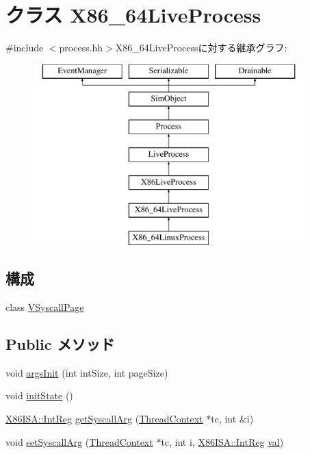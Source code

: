 \hypertarget{classX86ISA_1_1X86__64LiveProcess}{
\section{クラス X86\_\-64LiveProcess}
\label{classX86ISA_1_1X86__64LiveProcess}
}


{\ttfamily \#include $<$process.hh$>$}X86\_\-64LiveProcessに対する継承グラフ:\begin{figure}[H]
\begin{center}
\leavevmode
\includegraphics[height=7cm]{classX86ISA_1_1X86__64LiveProcess}
\end{center}
\end{figure}
\subsection*{構成}
\begin{DoxyCompactItemize}
\item 
class \hyperlink{classX86ISA_1_1X86__64LiveProcess_1_1VSyscallPage}{VSyscallPage}
\end{DoxyCompactItemize}
\subsection*{Public メソッド}
\begin{DoxyCompactItemize}
\item 
void \hyperlink{classX86ISA_1_1X86__64LiveProcess_a60e5314ffeede1e51c6bcb2cf606ca92}{argsInit} (int intSize, int pageSize)
\item 
void \hyperlink{classX86ISA_1_1X86__64LiveProcess_a3c34ea9b29f410748d4435a667484924}{initState} ()
\item 
\hyperlink{namespaceX86ISA_a0e080577527fb3e9685399f75b5caf15}{X86ISA::IntReg} \hyperlink{classX86ISA_1_1X86__64LiveProcess_a6f33c62983b3e68106d1cdb43b9fc09c}{getSyscallArg} (\hyperlink{classThreadContext}{ThreadContext} $\ast$tc, int \&i)
\item 
void \hyperlink{classX86ISA_1_1X86__64LiveProcess_a834e8e05416e3487f87d942259506abe}{setSyscallArg} (\hyperlink{classThreadContext}{ThreadContext} $\ast$tc, int i, \hyperlink{namespaceX86ISA_a0e080577527fb3e9685399f75b5caf15}{X86ISA::IntReg} \hyperlink{namespaceX86ISA_ae13bf1250853ff6b72aabe3c79b587cc}{val})
\end{DoxyCompactItemize}
